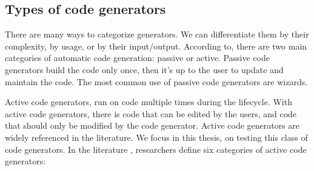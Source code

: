 \subsection{Types of code generators}
\label{bg:Types of code generators}
There are many ways to categorize generators. We can differentiate them by their complexity, by usage, or by their input/output. According to\cite{herrington2003code}, there are two main categories of automatic code generation: passive or active. Passive code generators build the code only once, then it’s up to the user to update and maintain the code. 
The most common use of passive code generators are wizards. 

Active code generators, run on code multiple times during the lifecycle. With active code generators, there is code that can be edited by the users, and code that should only be modified by the code generator. Active code generators are widely referenced in the literature\cite{pais2005tool,amanquah2009rapid}. We focus in this thesis, on testing this class of code generators.
In the literature \cite{herrington2003code,hunt2000pragmatic,fertalj2008source,bajovs2013code}, researchers define six categories of active code generators: 


